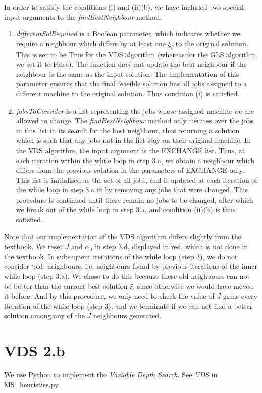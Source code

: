 \documentclass[12pt,a4paper,reqno]{article}
\begin{document}
In order to satisfy the conditions (i) and (ii)(b), we have included two special input arguments to the \textit{findBestNeighbour} method:
\begin{enumerate}
\item \textit{differentSolRequired} is a Boolean parameter, which indicates whether we require a neighbour which differs by at least one $\xi_i$ to the original solution. This is set to be True for the VDS algorithm (whereas for the GLS algorithm, we set it to False). The function does not update the best neighbour if the neighbour is the same as the input solution. The implementation of this parameter ensures that the final feasible solution has all jobs assigned to a different machine to the original solution. Thus condition (i) is satisfied.
\item \textit{jobsToConsider} is a list representing the jobs whose assigned machine we are allowed to change. The \textit{findBestNeighbour} method only iterates over the jobs in this list in its search for the best neighbour, thus returning a solution which is such that any jobs not in the list stay on their original machine. In the VDS algorithm, the input argument is the EXCHANGE list. Thus, at each iteration within the while loop in step 3.a, we obtain a neighbour which differs from the previous solution in the parameters of EXCHANGE only. This list is initialised as the set of all jobs, and is updated at each iteration of the while loop in step 3.a.iii by removing any jobs that were changed. This procedure is continued until there remain no jobs to be changed, after which we break out of the while loop in step 3.a, and condition (ii)(b) is thus satisfied.
\end{enumerate}

Note that our implementation of the VDS algorithm differs slightly from the textbook. We reset $J$ and $\alpha_J$ in step 3.d, displayed in red, which is not done in the textbook. In subsequent iterations of the while loop (step 3), we do not consider `old' neighbours, i.e. neighbours found by previous iterations of the inner while loop (step 3.a). We chose to do this because these old neighbours can not be better than the current best solution $\xi$, since otherwise we would have moved it before. And by this procedure, we only need to check the value of $J$ gains every iteration of the while loop (step 3), and we terminate if we can not find a better solution among any of the $J$ neighbours generated.

\section*{VDS 2.b}
We use Python to implement the \emph{Variable Depth Search}. See \emph{VDS} in MS\_heuristics.py.
\end{document}
